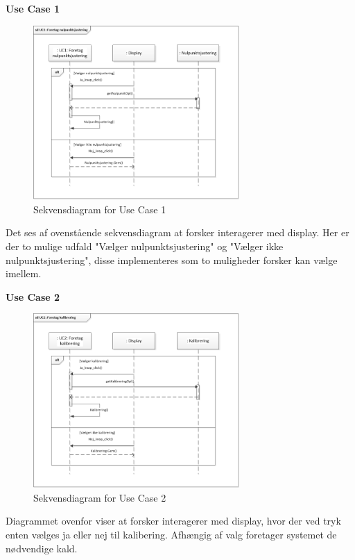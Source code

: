 \textbf{Use Case 1}
\begin{figure}[H]
	\centering
	\includegraphics[width=0.7\textwidth]{Figurer/UC1}
	\caption{Sekvensdiagram for Use Case 1}
\end{figure}
Det ses af ovenstående sekvensdiagram at forsker interagerer med display. Her er der to mulige udfald "Vælger nulpunktsjustering" og "Vælger ikke nulpunktsjustering", disse implementeres som to muligheder forsker kan vælge imellem. 

\textbf{Use Case 2}
\begin{figure}[H]
	\centering
	\includegraphics[width=0.7\textwidth]{Figurer/UC2}
	\caption{Sekvensdiagram for Use Case 2}
\end{figure}
Diagrammet ovenfor viser at forsker interagerer med display, hvor der ved tryk enten vælges ja eller nej til kalibering. Afhængig af valg foretager systemet de nødvendige kald.

